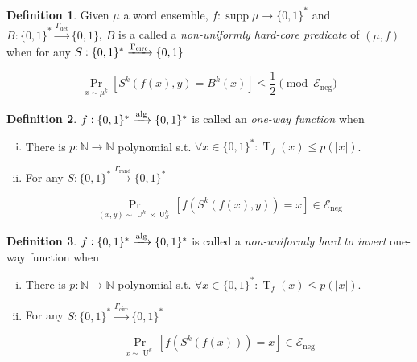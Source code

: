 \documentclass{article}
\numberwithin{equation}{section}
\theoremstyle{definition}
\newtheorem{definition}{Definition}[section]
\theoremstyle{plain}
\newcommand{\Bool}{\{0,1\}}
\newcommand{\Words}{{\Bool^*}}
\DeclareMathOperator{\Supp}{supp}
\DeclareMathOperator{\Prb}{Pr}
\DeclareMathOperator{\T}{T}
\DeclareMathOperator{\Un}{U}
\newcommand{\Nats}{\mathbb{N}}
\newcommand{\Abs}[1]{\lvert #1 \rvert}
\newcommand{\Fall}{\mathcal{E}}
\newcommand{\Alg}{\xrightarrow{\textnormal{alg}}}
\begin{document}
\begin{samepage}
\begin{definition}

Given $\mu$ a word ensemble, $f: \Supp \mu \rightarrow \Words$ and ${B: \Words \xrightarrow{\Gamma_{\text{det}}} \Bool}$, $B$ is a called a \emph{non-uniformly hard-core predicate} of $(\mu,f)$ when for any ${S: \Words \xrightarrow{\Gamma_{\textnormal{circ}}} \Bool}$ 

\begin{equation}
\Prb_{x \sim \mu^k}[S^k(f(x),y)=B^k(x)] \leq \frac{1}{2} \pmod {\Fall_{\text{neg}}}
\end{equation}

\end{definition}
\end{samepage}

\begin{samepage}
\begin{definition}

$f: \Words \Alg \Words$ is called an \emph{one-way function}
when

\begin{enumerate}[(i)]

\item There is $p: \Nats \rightarrow \Nats$ polynomial s.t. $\forall x \in \Words: \T_f(x) \leq p(\Abs{x})$.

\item For any $S: \Words \xrightarrow{\Gamma_{\text{rand}}} \Words$

\begin{equation}
\Prb_{(x,y) \sim \Un^k \times \Un_S^k}[f(S^k(f(x),y))=x] \in \Fall_{\text{neg}}
\end{equation}

\end{enumerate}

\end{definition}
\end{samepage}

\begin{samepage}
\begin{definition}

$f: \Words \Alg \Words$ is called a \emph{non-uniformly hard to invert} one-way function
when

\begin{enumerate}[(i)]

\item There is $p: \Nats \rightarrow \Nats$ polynomial s.t. $\forall x \in \Words: \T_f(x) \leq p(\Abs{x})$.

\item For any $S: \Words \xrightarrow{\Gamma_{\text{circ}}} \Words$

\begin{equation}
\Prb_{x \sim \Un^k}[f(S^k(f(x)))=x] \in \Fall_{\text{neg}}
\end{equation}

\end{enumerate}

\end{definition}
\end{samepage}
\end{document}
